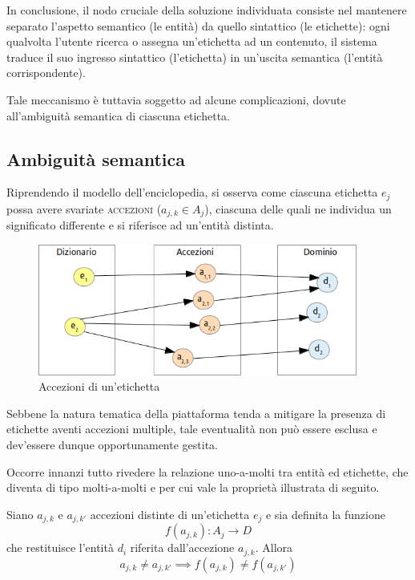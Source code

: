In conclusione, il nodo cruciale della soluzione individuata consiste nel mantenere separato l'aspetto semantico (le entità) da quello sintattico (le etichette): ogni qualvolta l'utente ricerca o assegna un'etichetta ad un contenuto, il sistema traduce il suo ingresso sintattico (l'etichetta) in un'uscita semantica (l'entità corrispondente).

Tale meccanismo è tuttavia soggetto ad alcune complicazioni, dovute all'ambiguità semantica di ciascuna etichetta.

\subsection{Ambiguità semantica}
\label{sec:tesi:stage:criterio-classificazione:ambiguità-semantica}
Riprendendo il modello dell'enciclopedia, si osserva come ciascuna etichetta $e_j$ possa avere svariate \textsc{accezioni} ($a_{j,k} \in A_j$), ciascuna delle quali ne individua un significato differente e si riferisce ad un'entità distinta.

\begin{figure}[ht]
	\begin{center}
		\includegraphics[width=10.5cm]{img/ambiguita-semantica.png}
		\caption{Accezioni di un'etichetta}
		\label{fig:tesi:stage:fase-uno:etichette-accezioni}
	\end{center}
\end{figure}

Sebbene la natura tematica della piattaforma tenda a mitigare la presenza di etichette aventi accezioni multiple, tale eventualità non può essere esclusa e dev'essere dunque opportunamente gestita.

Occorre innanzi tutto rivedere la relazione uno-a-molti tra entità ed etichette, che diventa di tipo molti-a-molti e per cui vale la proprietà illustrata di seguito.

Siano $a_{j,k}$ e $a_{j,k'}$ accezioni distinte di un'etichetta $e_j$ e sia definita la funzione
\begin{equation}
f(a_{j,k}): A_j \rightarrow D
\end{equation}
che restituisce l'entità $d_i$ riferita dall'accezione $a_{j,k}$. Allora
\begin{equation}
a_{j,k} \neq a_{j,k'} \implies f(a_{j,k}) \neq f(a_{j,k'})
\end{equation}


